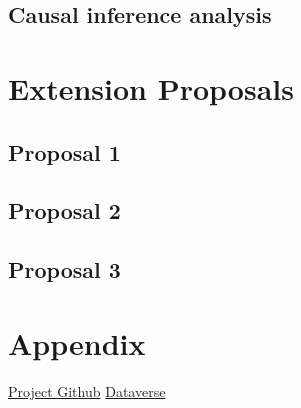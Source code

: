 \documentclass[12pt]{article}%
\begin{document}
\subsection*{Causal inference analysis}
\section*{Extension Proposals} 
\subsection*{Proposal 1}
\subsection*{Proposal 2}
\subsection*{Proposal 3}


\section*{Appendix}
\href{https://github.com/dliu18/firearms-replication}{Project Github}
\href{https://dataverse.harvard.edu/dataset.xhtml?persistentId=doi:10.7910/DVN/EVLKBN}{Dataverse}
\end{document}
